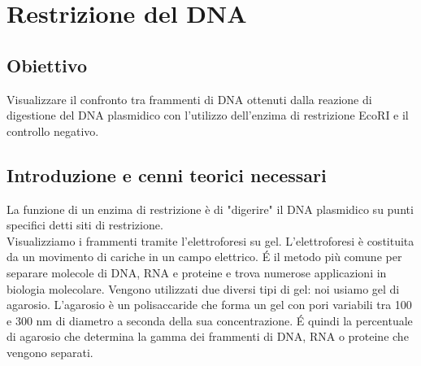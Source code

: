 \documentclass{extarticle}
\begin{document}
\newpage
\section{Restrizione del DNA}
\subsection*{Obiettivo} Visualizzare il confronto tra frammenti di DNA ottenuti dalla reazione di digestione del DNA plasmidico con l'utilizzo dell'enzima di restrizione EcoRI e il controllo negativo.
\subsection*{Introduzione e cenni teorici necessari}
La funzione di un enzima di restrizione è di "digerire" il DNA plasmidico su punti specifici detti siti di
restrizione.\\
Visualizziamo i frammenti tramite l'elettroforesi su gel. L'elettroforesi è costituita da un movimento di cariche in un campo elettrico. É il metodo più comune per separare molecole di DNA, RNA e proteine e trova numerose applicazioni in biologia molecolare. Vengono utilizzati
due diversi tipi di gel: noi usiamo gel di agarosio. L'agarosio è un polisaccaride che forma un gel con pori
variabili tra 100 e 300 nm di diametro a seconda della sua concentrazione. É quindi la percentuale di agarosio che
determina la gamma dei frammenti di DNA, RNA o proteine che vengono separati.
\end{document}
